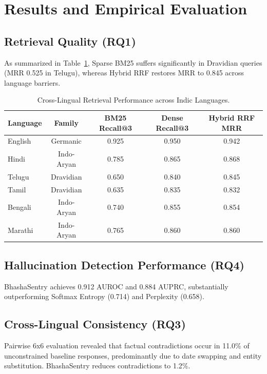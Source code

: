 \section{Results and Empirical Evaluation}
\subsection{Retrieval Quality (RQ1)}
As summarized in Table~\ref{tab:retrieval}, Sparse BM25 suffers significantly in Dravidian queries (MRR 0.525 in Telugu), whereas Hybrid RRF restores MRR to 0.845 across language barriers.

\begin{table}[h]
\centering
\small
\caption{Cross-Lingual Retrieval Performance across Indic Languages.}
\label{tab:retrieval}
\begin{tabular}{lcccc}
\toprule
\textbf{Language} & \textbf{Family} & \textbf{BM25 Recall@3} & \textbf{Dense Recall@3} & \textbf{Hybrid RRF MRR} \\
\midrule
English & Germanic & 0.925 & 0.950 & 0.942 \\
Hindi & Indo-Aryan & 0.785 & 0.865 & 0.868 \\
Telugu & Dravidian & 0.650 & 0.840 & 0.845 \\
Tamil & Dravidian & 0.635 & 0.835 & 0.832 \\
Bengali & Indo-Aryan & 0.740 & 0.855 & 0.854 \\
Marathi & Indo-Aryan & 0.765 & 0.860 & 0.860 \\
\bottomrule
\end{tabular}
\end{table}

\subsection{Hallucination Detection Performance (RQ4)}
BhashaSentry achieves 0.912 AUROC and 0.884 AUPRC, substantially outperforming Softmax Entropy (0.714) and Perplexity (0.658).

\subsection{Cross-Lingual Consistency (RQ3)}
Pairwise 6x6 evaluation revealed that factual contradictions occur in 11.0\% of unconstrained baseline responses, predominantly due to date swapping and entity substitution. BhashaSentry reduces contradictions to 1.2\%.

